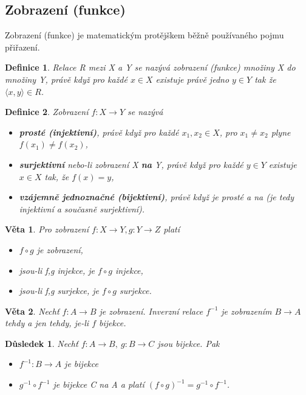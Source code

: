 \documentclass[12pt,a4paper]{article}
\newtheorem{definition}{Definice}
\newtheorem{sentence}{Věta}
\newtheorem{result}{Důsledek}
\begin{document}
\subsection{Zobrazení (funkce)}
Zobrazení (funkce) je matematickým protějškem běžně používaného pojmu přiřazení.

\begin{definition}
	Relace R mezi X a Y se nazývá zobrazení (funkce) množiny X do množiny Y, právě když pro každé $x \in X$ existuje právě jedno $y \in Y$ tak že $\langle x, y \rangle \in R$.
\end{definition}

\begin{definition}
	Zobrazení $f : X \rightarrow Y$ se nazývá
	\begin{itemize}
		\item[a)] \textbf{prosté (injektivní)}, právě když pro každé $x_1,x_2 \in X$, pro $x_1 \not= x_2$ plyne $f(x_1) \not= f(x_2)$,
		\item[b)] \textbf{surjektivní} nebo-li zobrazení X \textbf{na} Y, právě když pro každé $y \in Y$ existuje $x \in X$ tak, že  $f(x) = y$,
		\item[c)] \textbf{vzájemně jednoznačné (bijektivní)}, právě když je prosté a na (je tedy injektivní a současně surjektivní).
	\end{itemize}
\end{definition}

\begin{sentence}
	Pro zobrazení $f : X \rightarrow Y, g : Y \rightarrow Z$ platí
	\begin{itemize}
		\item[a)] $f \circ g$ je zobrazení,
		\item[b)] jsou-li f,g injekce, je $f \circ g$ injekce,
		\item[c)] jsou-li f,g surjekce, je $f \circ g$ surjekce.
	\end{itemize}
\end{sentence}

\begin{sentence}
	Nechť $f: A \rightarrow B$ je zobrazení. Inverzní relace $f^{-1}$ je zobrazením $B \rightarrow A$ tehdy a jen tehdy, je-li $f$ bijekce.
\end{sentence}

\begin{result}
	Nechť $f: A \rightarrow B, \ g: B \rightarrow C$ jsou bijekce. Pak
	\begin{itemize}
		\item[a)] $f^{-1} : B \rightarrow A$ je bijekce
		\item[b)] $g^{-1} \circ f^{-1}$ je bijekce C na A a platí $(f \circ g)^{-1} = g^{-1} \circ f^{-1}$.
	\end{itemize}
\end{result}
\end{document}
